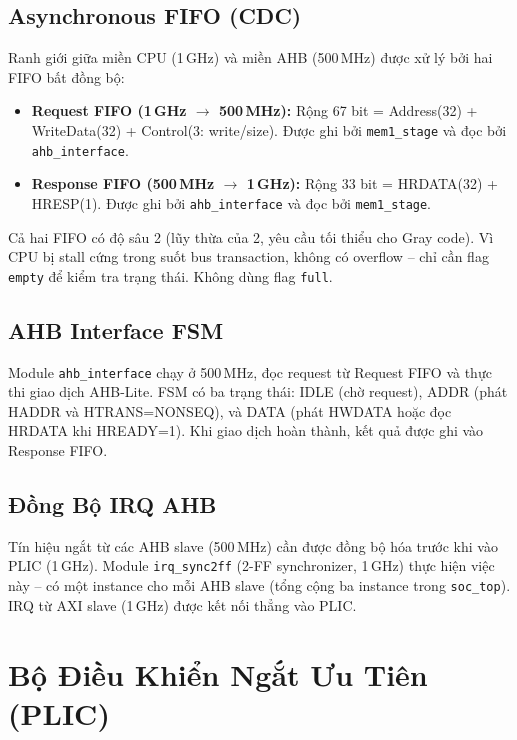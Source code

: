 \subsection{Asynchronous FIFO (CDC)}

Ranh giới giữa miền CPU (1\,GHz) và miền AHB (500\,MHz) được xử lý bởi hai FIFO bất đồng bộ:

\begin{itemize}
    \item \textbf{Request FIFO (1\,GHz $\rightarrow$ 500\,MHz):} Rộng 67 bit = Address(32) + WriteData(32) + Control(3: write/size). Được ghi bởi \texttt{mem1\_stage} và đọc bởi \texttt{ahb\_interface}.
    \item \textbf{Response FIFO (500\,MHz $\rightarrow$ 1\,GHz):} Rộng 33 bit = HRDATA(32) + HRESP(1). Được ghi bởi \texttt{ahb\_interface} và đọc bởi \texttt{mem1\_stage}.
\end{itemize}

Cả hai FIFO có độ sâu 2 (lũy thừa của 2, yêu cầu tối thiểu cho Gray code). Vì CPU bị stall cứng trong suốt bus transaction, không có overflow -- chỉ cần flag \texttt{empty} để kiểm tra trạng thái. Không dùng flag \texttt{full}.

\subsection{AHB Interface FSM}

Module \texttt{ahb\_interface} chạy ở 500\,MHz, đọc request từ Request FIFO và thực thi giao dịch AHB-Lite. FSM có ba trạng thái: IDLE (chờ request), ADDR (phát HADDR và HTRANS=NONSEQ), và DATA (phát HWDATA hoặc đọc HRDATA khi HREADY=1). Khi giao dịch hoàn thành, kết quả được ghi vào Response FIFO.

\subsection{Đồng Bộ IRQ AHB}

Tín hiệu ngắt từ các AHB slave (500\,MHz) cần được đồng bộ hóa trước khi vào PLIC (1\,GHz). Module \texttt{irq\_sync2ff} (2-FF synchronizer, 1\,GHz) thực hiện việc này -- có một instance cho mỗi AHB slave (tổng cộng ba instance trong \texttt{soc\_top}). IRQ từ AXI slave (1\,GHz) được kết nối thẳng vào PLIC.

\section{Bộ Điều Khiển Ngắt Ưu Tiên (PLIC)}

